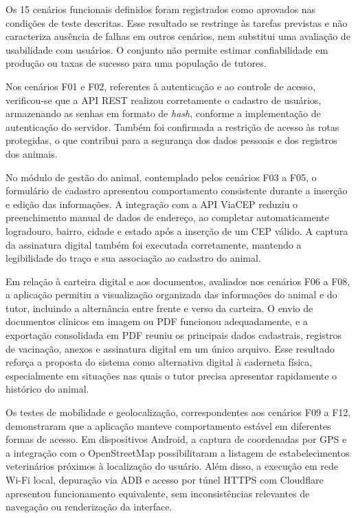 \documentclass{UNESC}
\begin{document}
Os 15 cenários funcionais definidos foram registrados como aprovados nas condições de teste descritas. Esse resultado se restringe às tarefas previstas e não caracteriza ausência de falhas em outros cenários, nem substitui uma avaliação de usabilidade com usuários. O conjunto não permite estimar confiabilidade em produção ou taxas de sucesso para uma população de tutores.

Nos cenários F01 e F02, referentes à autenticação e ao controle de acesso, verificou-se que a API REST realizou corretamente o cadastro de usuários, armazenando as senhas em formato de \textit{hash}, conforme a implementação de autenticação do servidor. Também foi confirmada a restrição de acesso às rotas protegidas, o que contribui para a segurança dos dados pessoais e dos registros dos animais.

No módulo de gestão do animal, contemplado pelos cenários F03 a F05, o formulário de cadastro apresentou comportamento consistente durante a inserção e edição das informações. A integração com a API ViaCEP reduziu o preenchimento manual de dados de endereço, ao completar automaticamente logradouro, bairro, cidade e estado após a inserção de um CEP válido. A captura da assinatura digital também foi executada corretamente, mantendo a legibilidade do traço e sua associação ao cadastro do animal.

Em relação à carteira digital e aos documentos, avaliados nos cenários F06 a F08, a aplicação permitiu a visualização organizada das informações do animal e do tutor, incluindo a alternância entre frente e verso da carteira. O envio de documentos clínicos em imagem ou PDF funcionou adequadamente, e a exportação consolidada em PDF reuniu os principais dados cadastrais, registros de vacinação, anexos e assinatura digital em um único arquivo. Esse resultado reforça a proposta do sistema como alternativa digital à caderneta física, especialmente em situações nas quais o tutor precisa apresentar rapidamente o histórico do animal.

Os testes de mobilidade e geolocalização, correspondentes aos cenários F09 a F12, demonstraram que a aplicação manteve comportamento estável em diferentes formas de acesso. Em dispositivos Android, a captura de coordenadas por GPS e a integração com o OpenStreetMap possibilitaram a listagem de estabelecimentos veterinários próximos à localização do usuário. Além disso, a execução em rede Wi-Fi local, depuração via ADB e acesso por túnel HTTPS com Cloudflare apresentou funcionamento equivalente, sem inconsistências relevantes de navegação ou renderização da interface.
\end{document}
